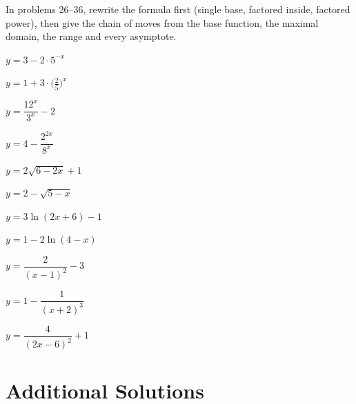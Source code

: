 In problems 26--36, rewrite the formula first (single base, factored
inside, factored power), then give the chain of moves from the base
function, the maximal domain, the range and every asymptote.

\begin{problems}[resume]
  \item $y=3-2\cdot5^{-x}$
  \item $y=1+3\cdot\bigl(\tfrac25\bigr)^{x}$
  \item $y=\dfrac{12^{x}}{3^{x}}-2$
  \item $y=4-\dfrac{2^{2x}}{8^{x}}$
  \item $y=2\sqrt{6-2x}+1$
  \item $y=2-\sqrt{5-x}$
  \item $y=3\ln(2x+6)-1$
  \item $y=1-2\ln(4-x)$
  \item $y=\dfrac{2}{(x-1)^{2}}-3$
  \item $y=1-\dfrac{1}{(x+2)^{3}}$
  \item $y=\dfrac{4}{(2x-6)^{2}}+1$
\end{problems}

\section{Additional Solutions}

